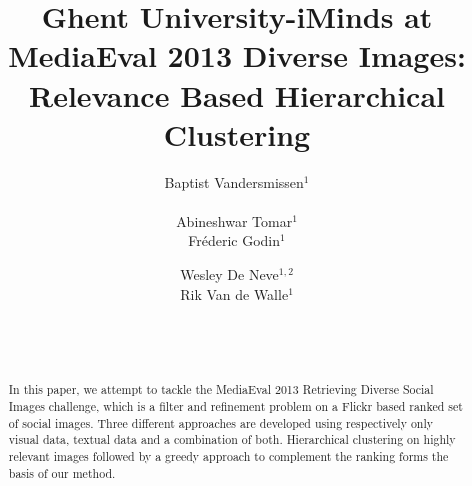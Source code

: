 \documentclass{acm_proc_article-me11_tweaked}
\begin{document}

\title{Ghent University-iMinds at MediaEval 2013 Diverse Images: Relevance Based Hierarchical Clustering}

\author{
\alignauthor
Baptist Vandersmissen$^1$\\
\\    
\alignauthor
Abineshwar Tomar$^1$ \\
\alignauthor
Fr\'ederic Godin$^1$\\
\and  %
\alignauthor
Wesley De Neve$^{1,2}$\\
\alignauthor
Rik Van de Walle$^1$\\
\and
\\
\\ 
}
\maketitle
  \begin{abstract}
In this paper, we attempt to tackle the MediaEval 2013 Retrieving Diverse Social Images challenge, which is a filter and refinement problem on a Flickr based ranked set of social images.
Three different approaches are developed using respectively only visual data, textual data and a combination of both.
Hierarchical clustering on highly relevant images followed by a greedy approach to complement the ranking forms the basis of our method.
\end{abstract}
% 
% 
\end{document}

